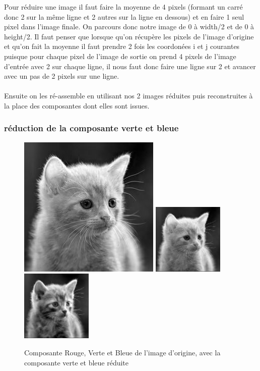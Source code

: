\documentclass{article}
\begin{document}
Pour réduire une image il faut faire la moyenne de 4 pixels (formant un carré donc 2 sur la même ligne et 2 autres sur la ligne en dessous) et en faire 1 seul pixel dans l'image finale.
On parcours donc notre image de 0 à width/2 et de 0 à height/2.
Il faut penser que lorsque qu'on récupère les pixels de l'image d'origine et qu'on fait la moyenne il faut prendre 2 fois les coordonées i et j courantes puisque pour chaque pixel de l'image de sortie on prend 4 pixels de l'image d'entrée avec 2 sur chaque ligne, il nous faut donc faire une ligne sur 2 et avancer avec un pas de 2 pixels sur une ligne.
\\\\
Ensuite on les ré-assemble en utilisant nos 2 images réduites puis reconstruites à la place des composantes dont elles sont issues.
\subsubsection*{réduction de la composante verte et bleue}

\begin{figure}[h]
\centerline{\includegraphics[scale=0.6]{./rendus/Red.png} \includegraphics[scale=0.8]{./rendus/ReduceGreen.png} \includegraphics[scale=0.8]{./rendus/ReduceBlue1.png} }
\caption{Composante Rouge, Verte et Bleue de l'image d'origine, avec la composante verte et bleue réduite}
\end{figure}
\end{document}
